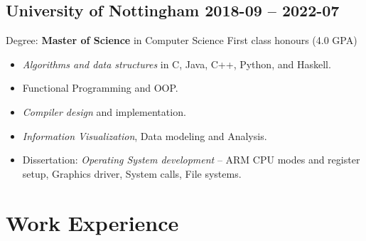 \subsection{University of Nottingham \hfill 2018-09 -- 2022-07}
Degree: \textbf{Master of Science} in Computer Science
        \hfill
        First class honours (4.0 GPA)
        \begin{itemize}
            \item \emph{Algorithms and data structures} in C, Java, C++,
                Python, and Haskell.
            \item Functional Programming and OOP.
            \item \emph{Compiler design} and implementation.
            \item \emph{Information Visualization}, Data modeling and Analysis.
            \item Dissertation: \emph{Operating System development} --
                    ARM CPU modes and register setup,
                    Graphics driver,
                    System calls,
                    File systems.
        \end{itemize}

\section{Work Experience}
